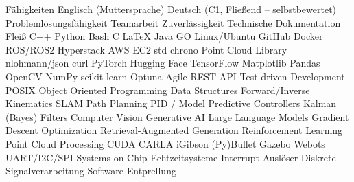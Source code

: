
\begin{rubric}{Fähigkeiten}
\entry*[Sprachen]
	\skilldotfirst Englisch (Muttersprache) \skilldot Deutsch (C1, Fließend -- selbstbewertet)
\entry*[Stärken] 
	\skilldotfirst Problemlösungsfähigkeit \skilldot Teamarbeit \skilldot Zuverlässigkeit \newline \skilldotfirst Technische Dokumentation \skilldot Fleiß %
\entry*[Coding]
	\skilldotfirst C++ \skilldot Python \skilldot Bash \skilldot C \skilldot LaTeX \skilldot Java \skilldot GO
\entry*[Software] 
	\skilldotfirst Linux/Ubuntu \skilldot GitHub \skilldot Docker \skilldot ROS/ROS2 \newline \skilldotfirst Hyperstack \skilldot AWS EC2
 \entry*[Libraries (C++)] 
 	\skilldotfirst std \skilldot chrono \skilldot Point Cloud Library \skilldot nlohmann/json \skilldot curl
\entry*[Libraries (Py)] 
	\skilldotfirst PyTorch \skilldot Hugging Face \skilldot TensorFlow \skilldot Matplotlib \skilldot Pandas \newline \skilldot OpenCV \skilldot NumPy \skilldot scikit-learn \skilldot Optuna
\entry*[Wissen] 	
	\skilldotfirst Agile \skilldot REST API \skilldot Test-driven Development \skilldot POSIX  \newline \skilldotfirst Object Oriented Programming \skilldot Data Structures 
\entry*[Robotics]
	\skilldotfirst Forward/Inverse Kinematics \skilldot SLAM \skilldot Path Planning \newline \skilldotfirst PID / Model Predictive Controllers \skilldot Kalman (Bayes) Filters
	\skilldotfirst Computer Vision \skilldot Generative AI \skilldot Large Language Models \newline \skilldotfirst Gradient Descent Optimization \skilldot Retrieval-Augmented Generation \newline \skilldotfirst Reinforcement Learning  \skilldot Point Cloud Processing \skilldot CUDA
\entry*[Simulators] 
	\skilldotfirst CARLA \skilldot iGibson \skilldot (Py)Bullet \skilldot Gazebo \skilldot Webots
\entry*[Mikrocontroller]
	\skilldotfirst UART/I2C/SPI \skilldot Systems on Chip \skilldot Echtzeitsysteme \newline \skilldotfirst Interrupt-Auslöser \skilldot Diskrete Signalverarbeitung \skilldot Software-Entprellung

\end{rubric}
